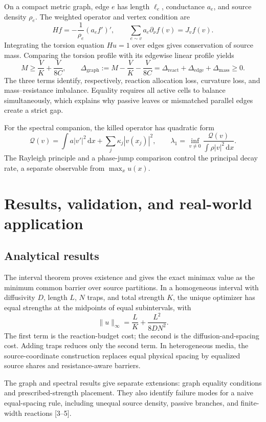 \documentclass[10pt]{article}
\newcommand{\dd}{\,\mathrm d}
\begin{document}
On a compact metric graph, edge $e$ has length $\ell_e$, conductance $a_e$, and source density $\rho_e$. The weighted operator and vertex condition are
\[
Hf=-\frac{1}{\rho_e}(a_ef')',
\qquad
\sum_{e\sim v}a_e\partial_\nu f(v)=J_vf(v).
\]
Integrating the torsion equation $Hu=1$ over edges gives conservation of source mass. Comparing the torsion profile with its edgewise linear profile yields
\[
M\geq\frac{V}{K}+\frac{V}{8C},
\qquad
\Delta_{\mathrm{graph}}:=M-\frac{V}{K}-\frac{V}{8C}
=\Delta_{\mathrm{react}}+\Delta_{\mathrm{edge}}+\Delta_{\mathrm{mass}}\geq0.
\]
The three terms identify, respectively, reaction allocation loss, curvature loss, and mass--resistance imbalance. Equality requires all active cells to balance simultaneously, which explains why passive leaves or mismatched parallel edges create a strict gap.

For the spectral companion, the killed operator has quadratic form
\[
\mathcal Q(v)=\int a|v'|^2\dd x+\sum_j\kappa_j|v(x_j)|^2,
\qquad
\lambda_1=\inf_{v\neq0}\frac{\mathcal Q(v)}{\int\rho|v|^2\dd x}.
\]
The Rayleigh principle and a phase-jump comparison control the principal decay rate, a separate observable from $\max_xu(x)$.

\section{Results, validation, and real-world application}

\subsection{Analytical results}

The interval theorem proves existence and gives the exact minimax value as the minimum common barrier over source partitions. In a homogeneous interval with diffusivity $D$, length $L$, $N$ traps, and total strength $K$, the unique optimizer has equal strengths at the midpoints of equal subintervals, with
\[
\|u\|_\infty=\frac{L}{K}+\frac{L^2}{8DN^2}.
\]
The first term is the reaction-budget cost; the second is the diffusion-and-spacing cost. Adding traps reduces only the second term. In heterogeneous media, the source-coordinate construction replaces equal physical spacing by equalized source shares and resistance-aware barriers.

The graph and spectral results give separate extensions: graph equality conditions and prescribed-strength placement. They also identify failure modes for a naive equal-spacing rule, including unequal source density, passive branches, and finite-width reactions [3--5].
\end{document}
